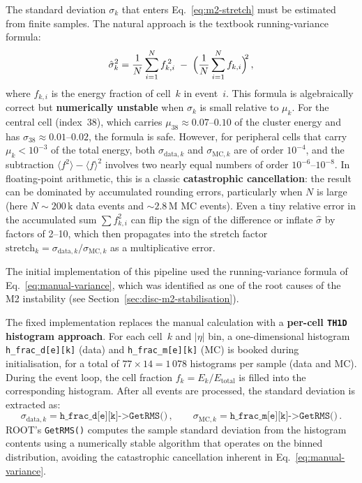 \documentclass[11pt,a4paper]{article}
\newcommand{\abseta}{\ensuremath{|\eta|}}
\newcommand{\Etot}{\ensuremath{E_{\mathrm{total}}}}
\begin{document}
The standard deviation $\sigma_k$ that enters Eq.~\eqref{eq:m2-stretch}
must be estimated from finite samples.  The natural approach is the
textbook running-variance formula:
\begin{equation}
  \hat\sigma_k^2 = \frac{1}{N}\sum_{i=1}^{N} f_{k,i}^{\,2}
                   \;-\; \Bigl(\frac{1}{N}\sum_{i=1}^{N} f_{k,i}\Bigr)^{\!\!2}
  \,,
  \label{eq:manual-variance}
\end{equation}
where $f_{k,i}$ is the energy fraction of cell~$k$ in event~$i$.  This
formula is algebraically correct but \textbf{numerically unstable} when
$\sigma_k$ is small relative to $\mu_k$.  For the central cell
(index~38), which carries $\mu_{38} \approx 0.07$--$0.10$ of the cluster
energy and has $\sigma_{38} \approx 0.01$--$0.02$, the formula is safe.
However, for peripheral cells that carry $\mu_k < 10^{-3}$ of the total
energy, both $\sigma_{\text{data},k}$ and $\sigma_{\text{MC},k}$ are of
order $10^{-4}$, and the subtraction
$\langle f^2 \rangle - \langle f \rangle^2$ involves two nearly equal
numbers of order $10^{-6}$--$10^{-8}$.  In floating-point arithmetic,
this is a classic \textbf{catastrophic cancellation}: the result can be
dominated by accumulated rounding errors, particularly when $N$ is large
(here $N \sim 200\,\text{k}$ data events and $\sim 2.8\,\text{M}$ MC
events).  Even a tiny relative error in the accumulated sum $\sum f_{k,i}^2$
can flip the sign of the difference or inflate $\hat\sigma$ by factors
of 2--10, which then propagates into the stretch factor
$\text{stretch}_k = \sigma_{\text{data},k} / \sigma_{\text{MC},k}$
as a multiplicative error.

The initial implementation of this pipeline used the running-variance
formula of Eq.~\eqref{eq:manual-variance}, which was identified as one
of the root causes of the M2 instability (see
Section~\ref{sec:disc-m2-stabilisation}).

The fixed implementation replaces the manual calculation with a
\textbf{per-cell \texttt{TH1D} histogram approach}.  For each cell~$k$
and $\abseta$ bin, a one-dimensional histogram
\texttt{h\_frac\_d[e][k]} (data) and \texttt{h\_frac\_m[e][k]} (MC) is
booked during initialisation, for a total of
$77 \times 14 = 1\,078$ histograms per sample (data and MC).  During
the event loop, the cell fraction $f_k = E_k / \Etot$ is filled into
the corresponding histogram.  After all events are processed, the
standard deviation is extracted as:
\begin{equation}
  \sigma_{\text{data},k} = \texttt{h\_frac\_d[e][k]->GetRMS()} \,,
  \qquad
  \sigma_{\text{MC},k} = \texttt{h\_frac\_m[e][k]->GetRMS()} \,.
  \label{eq:getrms}
\end{equation}
ROOT's \texttt{GetRMS()} computes the sample standard deviation from
the histogram contents using a numerically stable algorithm that
operates on the binned distribution, avoiding the catastrophic
cancellation inherent in Eq.~\eqref{eq:manual-variance}.
\end{document}
